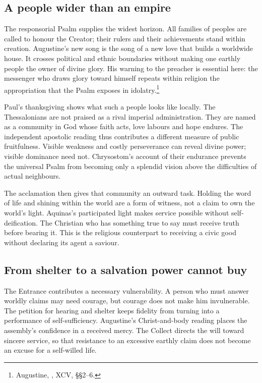 \subsection{A people wider than an empire}
The responsorial Psalm supplies the widest horizon. All families of peoples are called to honour the Creator; their rulers and their achievements stand within creation. Augustine's new song is the song of a new love that builds a worldwide house. It crosses political and ethnic boundaries without making one earthly people the owner of divine glory. His warning to the preacher is essential here: the messenger who draws glory toward himself repeats within religion the appropriation that the Psalm exposes in idolatry.\footnote{Augustine, , XCV, §§2--6.}

Paul's thanksgiving shows what such a people looks like locally. The Thessalonians are not praised as a rival imperial administration. They are named as a community in God whose faith acts, love labours and hope endures. The independent apostolic reading thus contributes a different measure of public fruitfulness. Visible weakness and costly perseverance can reveal divine power; visible dominance need not. Chrysostom's account of their endurance prevents the universal Psalm from becoming only a splendid vision above the difficulties of actual neighbours.

The acclamation then gives that community an outward task. Holding the word of life and shining within the world are a form of witness, not a claim to own the world's light. Aquinas's participated light makes service possible without self-deification. The Christian who has something true to say must receive truth before bearing it. This is the religious counterpart to receiving a civic good without declaring its agent a saviour.

\subsection{From shelter to a salvation power cannot buy}
The Entrance contributes a necessary vulnerability. A person who must answer worldly claims may need courage, but courage does not make him invulnerable. The petition for hearing and shelter keeps fidelity from turning into a performance of self-sufficiency. Augustine's Christ-and-body reading places the assembly's confidence in a received mercy. The Collect directs the will toward sincere service, so that resistance to an excessive earthly claim does not become an excuse for a self-willed life.

